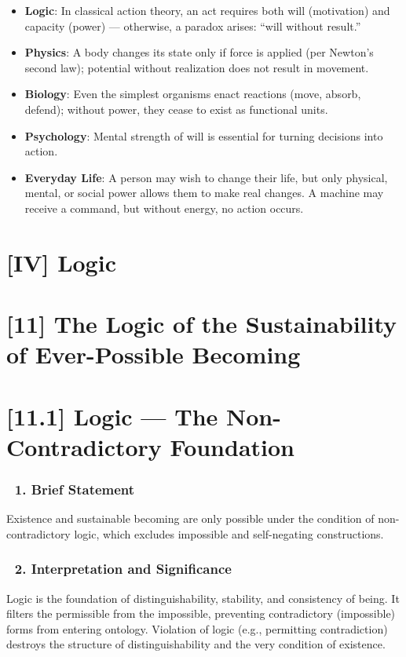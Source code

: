 \documentclass[12pt]{article}
\begin{document}
\begin{itemize}
\item \textbf{Logic}: In classical action theory, an act requires both will (motivation) and capacity (power) — otherwise, a paradox arises: ``will without result.''
\item \textbf{Physics}: A body changes its state only if force is applied (per Newton’s second law); potential without realization does not result in movement.
\item \textbf{Biology}: Even the simplest organisms enact reactions (move, absorb, defend); without power, they cease to exist as functional units.
\item \textbf{Psychology}: Mental strength of will is essential for turning decisions into action.
\item \textbf{Everyday Life}: A person may wish to change their life, but only physical, mental, or social power allows them to make real changes. A machine may receive a command, but without energy, no action occurs.
\end{itemize}


\section*{[IV] Logic}

\section*{[11] The Logic of the Sustainability of Ever-Possible Becoming}

\section*{[11.1] Logic — The Non-Contradictory Foundation}

\subsubsection*{🔹 1. Brief Statement}

Existence and sustainable becoming are only possible under the condition of non-contradictory logic, which excludes impossible and self-negating constructions.

\subsubsection*{🔹 2. Interpretation and Significance}

Logic is the foundation of distinguishability, stability, and consistency of being. It filters the permissible from the impossible, preventing contradictory (impossible) forms from entering ontology. Violation of logic (e.g., permitting contradiction) destroys the structure of distinguishability and the very condition of existence.
\end{document}
